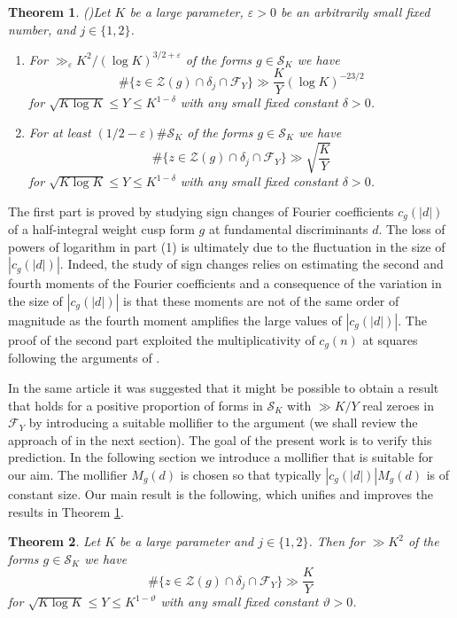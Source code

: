\documentclass[a4paper,10pt,twoside]{amsart}
\newtheorem{theorem}{Theorem}[section]
\theoremstyle{definition}
\numberwithin{equation}{section}
\newcommand\eps{\varepsilon}
\renewcommand\:{\colon}
\begin{document}
\begin{theorem}(\cite[Theorems 1.1. and 1.3]{Jaasaari2026})\label{prior-theorem} 
Let $K$ be a large parameter, $\eps>0$ be an arbitrarily small fixed number, and $j\in\{1,2\}$.
\begin{enumerate}
\item For $\gg_\eps K^2/(\log K)^{3/2+\eps}$ of the forms $g\in\mathcal S_K$ we have 
\[\#\{z\in\mathcal Z(g)\cap\delta_j\cap\mathcal F_Y\}\gg\frac K{Y}\left(\log K\right)^{-23/2}  \]
for $\sqrt{K\log K}\leq Y\leq K^{1-\delta}$ with any small fixed constant $\delta>0$. 
\item For at least $(1/2-\eps)\#\mathcal S_K$ of the forms $g\in\mathcal S_K$ we have 
\[\#\{z\in\mathcal Z(g)\cap\delta_j\cap\mathcal F_Y\}\gg\sqrt{\frac K{Y}} \]
for $\sqrt{K\log K}\leq Y\leq K^{1-\delta}$ with any small fixed constant $\delta>0$. 
\end{enumerate}
\end{theorem} 
\noindent The first part is proved by studying sign changes of Fourier coefficients $c_g(|d|)$ of a half-integral weight cusp form $g$ at fundamental discriminants $d$. The loss of powers of logarithm in part (1) is ultimately due to the fluctuation in the size of $|c_g(|d|)|$. Indeed, the study of sign changes relies on estimating the second and fourth moments of the Fourier coefficients and a consequence of the variation in the size of $|c_g(|d|)|$ is that these moments are not of the same order of magnitude as the fourth moment amplifies the large values of $|c_g(|d|)|$. The proof of the second part exploited the multiplicativity of $c_g(n)$ at squares following the arguments of \cite{Lester-Matomaki-Radziwill2018}. 

In the same article it was suggested that it might be possible to obtain a result that holds for a positive proportion of forms in $\mathcal S_K$ with $\gg K/Y$ real zeroes in $\mathcal F_Y$ by introducing a suitable mollifier to the argument (we shall review the approach of \cite{Jaasaari2026} in the next section). The goal of the present work is to verify this prediction. In the following section we introduce a mollifier that is suitable for our aim. The mollifier $M_g(d)$ is chosen so that typically $|c_g(|d|)|M_g(d)$ is of constant size.
Our main result is the following, which unifies and improves the results in Theorem \ref{prior-theorem}. 

\begin{theorem}\label{Main-theorem}
Let $K$ be a large parameter and $j\in\{1,2\}$. Then for $\gg K^2$ of the forms $g\in\mathcal S_K$ we have 
\[\#\{z\in\mathcal Z(g)\cap\delta_j\cap\mathcal F_Y\}\gg\frac K{Y}  \]
for $\sqrt{K\log K}\leq Y\leq K^{1-\vartheta}$ with any small fixed constant $\vartheta>0$. 
\end{theorem}
\end{document}
